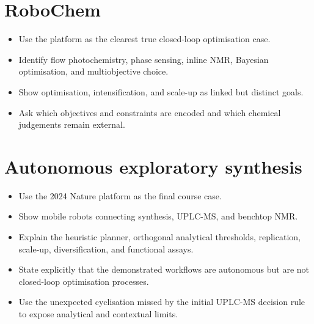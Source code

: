 \section{RoboChem}

\begin{itemize}
  \item Use the platform as the clearest true closed-loop optimisation case.
  \item Identify flow photochemistry, phase sensing, inline NMR, Bayesian optimisation, and multiobjective choice.
  \item Show optimisation, intensification, and scale-up as linked but distinct goals.
  \item Ask which objectives and constraints are encoded and which chemical judgements remain external.
\end{itemize}

\section{Autonomous exploratory synthesis}

\begin{itemize}
  \item Use the 2024 Nature platform as the final course case.
  \item Show mobile robots connecting synthesis, UPLC-MS, and benchtop NMR.
  \item Explain the heuristic planner, orthogonal analytical thresholds, replication, scale-up, diversification, and functional assays.
  \item State explicitly that the demonstrated workflows are autonomous but are not closed-loop optimisation processes.
  \item Use the unexpected cyclisation missed by the initial UPLC-MS decision rule to expose analytical and contextual limits.
\end{itemize}

